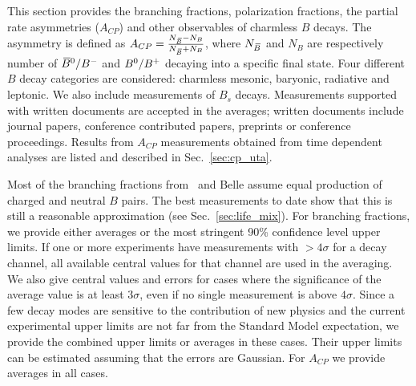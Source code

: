 

\label{sec:rare}

This section provides the branching fractions, polarization 
fractions, the partial rate asymmetries ($A_{CP}$) and other observables of charmless 
$B$ decays. The asymmetry is defined as 
$A_{CP} = \frac{N_{\kern 0.18em\overline{\kern -0.18em B}{}} -N_B}{N_{\kern 0.18em\overline{\kern -0.18em B}{}} +N_B}$, where $N_{\kern 0.18em\overline{\kern -0.18em B}{}}$ 
and $N_B$ are respectively number of $\kern 0.18em\overline{\kern -0.18em B}{}^0/B^{-}$ and $B^0/B^{+}$ decaying
into a specific final state. 
Four different $B$ decay categories are considered: 
charmless mesonic, baryonic, radiative and leptonic. We also include
measurements of $B_s$ decays.
Measurements supported with  written documents are accepted in  
the averages; written documents include journal papers, 
conference contributed papers, preprints or conference proceedings.  
Results from  $A_{CP}$ measurements  obtained from time dependent analyses 
are listed and described in Sec.~\ref{sec:cp_uta}.

Most of the branching fractions from \babar\ and Belle assume equal production 
of charged and neutral $B$ pairs.  The best measurements to date show that this
is still a reasonable approximation (see Sec.~\ref{sec:life_mix}).
For branching fractions, we provide either averages or the most stringent
90\% confidence level upper limits.  If one or more experiments have
measurements with $>\!\!4 \sigma$ for a decay channel, all available central values
for that channel are used in the averaging.  We also give central values
and errors for cases where the significance of the average value is at
least $3 \sigma$, even if no single measurement is above $4 \sigma$. 
Since a few decay modes are sensitive to the contribution of
new physics and the current experimental upper limits are not far from the 
Standard Model expectation, we provide the combined upper limits or
averages in these cases.
Their upper limits can be estimated assuming that the errors are 
Gaussian.  For $A_{CP}$ we provide averages in all cases.  

